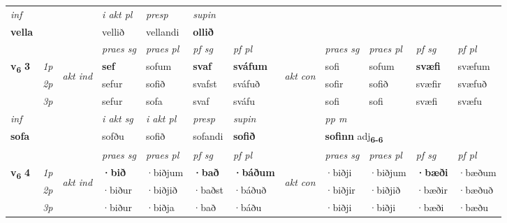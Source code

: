 \begin{longtable}[l]{X>{\footnotesize\itshape}llXXXXlXXXX}
   {\textit{inf}} & &  & \textit{i akt pl}   & \textit{presp} & \textit{supin}   \\*
  {\textbf{vella}} & &  & vellið   & vellandi &  \textbf{ollið}   \\*

\midrule

 & &   & \textit{praes sg}  & \textit{praes pl}    & \textit{ pf sg} & \textit{pf pl} & & \textit{praes sg}  & \textit{praes pl}    & \textit{pf sg} & \textit{pf pl }  \\ \cmidrule{4-7} \cmidrule{9-12}
 \multirow{2}{*}{{{\textbf{v{\textsubscript{6}}} \Large{\textbf{3}}}}}  & 1p & \multirow{3}{*}{\begin{turn}{90}\textit{akt ind}\end{turn}} & \textbf{sef} & sofum & \textbf{svaf} & \textbf{sváfum} & \multirow{3}{*}{\begin{turn}{90}\textit{akt con}\end{turn}} &sofi & sofum & \textbf{svæfi} & svæfum\\*
 & 2p &  &  sefur  & sofið & svafst & sváfuð & & sofir & sofið & svæfir & svæfuð \\*
 & 3p &  & sefur & sofa & svaf & sváfu & & sofi & sofi& svæfi & svæfu \\*
\cmidrule{4-7} \cmidrule{9-12}

   {\textit{inf}} & &  & \textit{i akt sg} & \textit{i akt pl}   & \textit{presp} & \textit{supin}  && \textit{pp m} \\*
  {\textbf{sofa}} & && sofðu  & sofið   & sofandi &  \textbf{sofið}  && \multicolumn{2}{l}{\textbf{sofinn} adj\textbf{\textsubscript{6-6}}} \\*

\midrule

 & &   & \textit{praes sg}  & \textit{praes pl}    & \textit{ pf sg} & \textit{pf pl} & & \textit{praes sg}  & \textit{praes pl}    & \textit{pf sg} & \textit{pf pl }  \\ \cmidrule{4-7} \cmidrule{9-12}
 \multirow{2}{*}{{{\textbf{v{\textsubscript{6}}} \Large{\textbf{4}}}}}  & 1p & \multirow{3}{*}{\begin{turn}{90}\textit{akt ind}\end{turn}} & \textbf{·bið} & ·biðjum & \textbf{·bað} & \textbf{·báðum} & \multirow{3}{*}{\begin{turn}{90}\textit{akt con}\end{turn}} &·biðji & ·biðjum & \textbf{·bæði} & ·bæðum\\*
 & 2p &  &  ·biður  & ·biðjið & ·baðst & ·báðuð & & ·biðjir & ·biðjið & ·bæðir & ·bæðuð \\*
 & 3p &  & ·biður & ·biðja & ·bað & ·báðu & & ·biðji & ·biðji& ·bæði & ·bæðu \\*
\cmidrule{4-7} \cmidrule{9-12}


\end{longtable}
